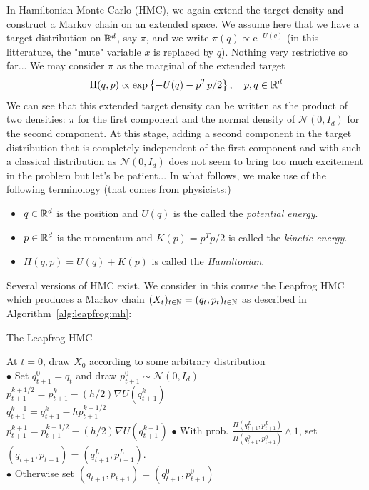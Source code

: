\documentclass[english,graybox,envcountchap,envcountsame,sectrefs,shortlabels]{svmono}
\theoremstyle{style}
\newcommand{\rme}{\mathrm{e}}
\newcommand{\gauss}{\mathcal{N}}
\newcommand{\eqsp}{}
\begin{document}
In Hamiltonian Monte Carlo (HMC), we again extend the target density and construct a Markov chain on an extended space. We assume here that we have a target distribution on $\mathbb{R}^d$, say $\pi$, and we write $\pi(q)\propto \rme^{-U(q)}$ (in this litterature, the "mute" variable $x$ is replaced by $q$). Nothing very restrictive so far... We may consider $\pi$ as the marginal of the extended target
\begin{equation}
\label{eq:targ:hmc}
\Pi(q,p) \propto \exp \lrcb{-U(q)-p^Tp/2}\eqsp, \quad p,q \in \rset^d
\end{equation}
We can see that this extended target density can be written as the product of two densities: $\pi$ for the first component and the normal density of  $\gauss(0,I_d)$ for the second component. At this stage, adding a second component in the target distribution that is completely independent of the first component and with such a classical distribution as $\gauss(0,I_d)$ does not seem to bring too much excitement in the problem but let's be patient...
In what follows, we make use of the following terminology (that comes from physicists:)
\begin{itemize}
\item $q\in \mathbb{R}^d$ is the position and $U(q)$ is the called the {\em potential energy}.
\item $p\in \mathbb{R}^d$ is the momentum and $K(p)=p^Tp/2$ is called the {\em kinetic energy}.
\item $H(q,p)=U(q)+K(p)$ is called the {\em Hamiltonian}.
\end{itemize}
  
Several versions of HMC exist. We consider in this course the Leapfrog HMC which produces a Markov chain $(X_t)_{t\in\mathbb{N}}=(q_t,p_t)_{t\in\mathbb{N}}$    as described in Algorithm~\ref{alg:leapfrog:mh}:
\begin{algorithm}
\caption{\label{alg:leapfrog:mh} The Leapfrog HMC}

{}
\BlankLine
At $t=0$, draw $X_{0}$ according to some arbitrary distribution\\
{
$\bullet$ Set $q_{t+1}^0=q_{t}$ and draw $p_{t+1}^0\sim \gauss(0,I_d)$ \\
    {
    $p_{t+1}^{k+1/2}=p_{t+1}^k-(h/2) \nabla U(q_{t+1}^k)$\\
    $q_{t+1}^{k+1}=q_{t+1}^k-h p_{t+1}^{k+1/2}$\\
    $p_{t+1}^{k+1}=p_{t+1}^{k+1/2}-(h/2) \nabla U (q_{t+1}^{k+1})$
    }
$\bullet$ With prob. $\frac{\Pi(q_{t+1}^L,p_{t+1}^L)}{\Pi(q_{t+1}^0,p_{t+1}^0)}\wedge 1$, set $(q_{t+1},p_{t+1})=(q_{t+1}^L,p_{t+1}^L)$.\\
 $\bullet$ Otherwise set $(q_{t+1},p_{t+1})=(q_{t+1}^0,p_{t+1}^0)$
}
\end{algorithm}
\end{document}
